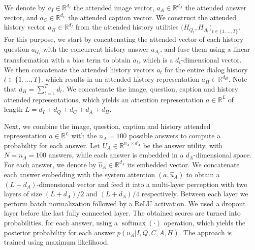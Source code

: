 \documentclass[10pt,twocolumn,letterpaper]{article}
\begin{document}
We denote by $a_I \in\mathbb{R}^{d_I}$ the attended image vector, $a_A  \in\mathbb{R}^{d_A}$ the attended answer vector, and $a_C \in  \mathbb{R}^{d_C} $ the attended caption vector. We construct the attended history vector $a_H \in \mathbb{R}^{d_I}$ from the attended history utilities $\big( H_{Q_t}, H_{A_t}\big)_{t\in\{1, \ldots, T\}}$. For this purpose, we start by concatenating the attended vector of each history question $a_{Q_t}$ with the concurrent history answer $a_{A_t}$, and fuse them using a linear transformation with a bias term to obtain $a_t$, which is a $ d_t $-dimensional vector. We then concatenate the attended history vectors $a_t$ for the entire dialog history  $t\in\{1,\ldots,T\}$, which results in an attended history representation $a_H \in \mathbb{R}^{d_H} $. Note that $d_H = \sum_{t=1}^T d_t$. We concatenate the image, question, caption and history  attended representations, which yields an attention representation $a \in \mathbb{R}^L $ of length $ L = d_I + d_Q + d_C + d_A + d_H$. 

Next, we combine the image, question, caption and history attended representation $a \in \mathbb{R}^L $ with the $n_A = 100$ possible answers to compute a probability for each answer. Let $U_A \in \mathbb{R}^{n_A \times d_A}$ be the answer utility, with $N = n_A = 100$ answers, while each answer is embedded in a $d_A$-dimensional space. For each answer, we denote by $\hat u_A \in \mathbb{R}^{d_A}$ 
its embedded vector. We concatenate each answer embedding with the system attention $(a,\hat u_A)$ to obtain a $(L + d_A)$-dimensional vector and feed it into a multi-layer perception  with two layers of size $ (L + d_A)/2 $ and $ (L + d_A)/4 $ respectively.  Between each layer we perform batch normalization followed by a ReLU activation. We used a dropout layer before the last fully connected layer. The obtained scores are turned into probabilities, for each answer,  using a $\operatorname{softmax}\left(\cdot\right)$ operation, which yields the posterior probability for each answer $ p( u_A | I,Q,C,A,H) $.
The approach is trained using maximum likelihood. 





 
\end{document}
